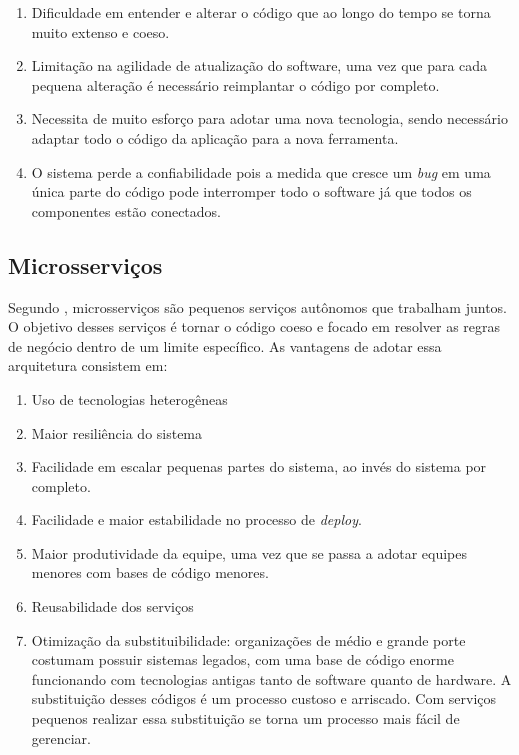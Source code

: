   \begin{enumerate}
    \item Dificuldade em entender e alterar o código que ao longo do tempo se torna
    muito extenso e coeso.
    \item Limitação na agilidade de atualização do software, uma vez que para cada
    pequena alteração é necessário reimplantar o código por completo.
    \item Necessita de muito esforço para adotar uma nova tecnologia, sendo
    necessário adaptar todo o código da aplicação para a nova ferramenta.
    \item O sistema perde a confiabilidade pois a medida que cresce um \textit{bug}
    em uma única parte do código pode interromper todo o software já que todos os
    componentes estão conectados.
  \end{enumerate}

\subsection{Microsserviços}

Segundo , microsserviços são pequenos serviços autônomos que
trabalham juntos. O objetivo desses serviços é tornar o código coeso e focado em
resolver as regras de negócio dentro de um limite específico. As vantagens de adotar
essa arquitetura consistem em:

\begin{enumerate}
    \item{Uso de tecnologias heterogêneas}
    \item{Maior resiliência do sistema}
    \item{Facilidade em escalar pequenas partes do sistema, ao invés do sistema por
    completo.}
    \item{Facilidade e maior estabilidade no processo de \textit{deploy}.}
    \item{Maior produtividade da equipe, uma vez que se passa a adotar equipes
    menores com bases de código menores.}
    \item{Reusabilidade dos serviços}
    \item{Otimização da substituibilidade: organizações de médio e grande porte costumam
    possuir sistemas legados, com uma base de código enorme funcionando com tecnologias
    antigas tanto de software quanto de hardware. A substituição desses códigos é um
    processo custoso e arriscado. Com serviços pequenos realizar essa substituição
    se torna um processo mais fácil de gerenciar.}
\end{enumerate}

